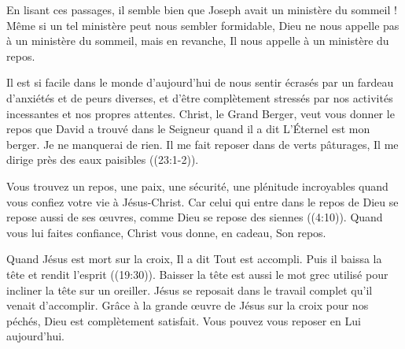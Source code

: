 En lisant ces passages, il semble bien que Joseph avait un \Og ministère du sommeil \Fg{}! Même si un tel ministère peut nous sembler formidable, Dieu ne nous appelle pas à un ministère du sommeil, mais en revanche, Il nous appelle à un ministère du repos.

Il est si facile dans le monde d'aujourd'hui de nous sentir écrasés par un fardeau d'anxiétés et de peurs diverses, et d'être complètement stressés par nos activités incessantes et nos propres attentes. Christ, le Grand Berger, veut vous donner le repos que David a trouvé dans le Seigneur quand il a dit\frcolon{} \Og L’Éternel est mon berger. Je ne manquerai de rien. Il me fait reposer dans de verts pâturages, Il me dirige près des eaux paisibles \Fg{} ((23:1-2)).

Vous trouvez un repos, une paix, une sécurité, une plénitude incroyables quand vous confiez votre vie à Jésus-Christ. \Og Car celui qui entre dans le repos de Dieu se repose aussi de ses \oe{}uvres, comme Dieu se repose des siennes \Fg{} ((4:10)). Quand vous lui faites confiance, Christ vous donne, en cadeau, Son repos.

Quand Jésus est mort sur la croix, Il a dit\frcolon{} \Og Tout est accompli. \Fg{} Puis il baissa la tête et rendit l’esprit ((19:30)). \Og Baisser la tête \Fg{} est aussi le mot grec utilisé pour incliner la tête sur un oreiller. Jésus se reposait dans le travail complet qu'il venait d'accomplir. Grâce à la grande œuvre de Jésus sur la croix pour nos péchés, Dieu est complètement satisfait. Vous pouvez vous reposer en Lui aujourd'hui.

\begin{dvquotes}
\end{dvquotes}
